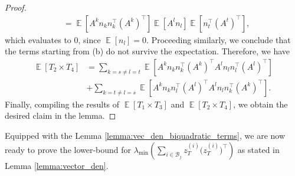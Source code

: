 \documentclass[letterpaper, 11 pt]{article}
\newcommand{\mc}{\mathcal}
\DeclareMathOperator{\E}{\mathbb{E}}
\begin{document}
\begin{proof}
\begin{align*}
    &= \E\left[ A^kn_k n_k^{\top} (A^k)^{\top}\right] \E\left[ A^l n_l  \right] \E\left[ n_t^{\top}(A^t)^{\top} \right],
\end{align*}
which evaluates to $0$, since $\E \left [ n_l \right] =0.$ Proceeding similarly, we conclude that the terms starting from (b) do not survive the expectation. Therefore, we have
    \begin{align*}
        \E[T_2 \times T_4] & = \sum_{k=s \neq l=t} \E\left[ A^kn_kn_k^{\top}(A^k)^{\top} A^ln_ln_l^{\top}(A^l)^{\top}\right] \\
        & + \sum_{k=t \neq l=s} \E\left[ A^kn_kn_l^{\top}(A^l)^{\top} A^ln_ln_k^{\top}(A^k)^{\top}\right].
    \end{align*}
    Finally, compiling the results of $\E[T_1 \times T_3]$ and $\E[T_2 \times T_4]$, we obtain the desired claim in the lemma.
\end{proof}

Equipped with the Lemma \ref{lemma:vec_den_biquadratic_terms}, we are now ready to prove the lower-bound for $\lambda_{\min}{\left(\sum_{i \in \mc{B}_j} z_T^{(i)}\big(z_T^{(i)}\big)^{\top}\right)}$ as stated in Lemma \ref{lemma:vector_den}.
\end{document}
